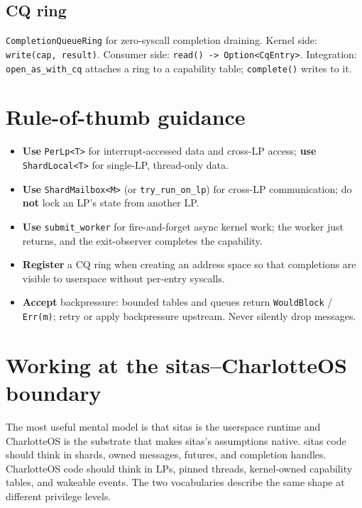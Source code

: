 \subsection{CQ ring} \texttt{CompletionQueueRing} for zero-syscall completion
draining. Kernel side: \texttt{write(cap, result)}. Consumer side:
\texttt{read() -> Option<CqEntry>}. Integration: \texttt{open\_as\_with\_cq}
attaches a ring to a capability table; \texttt{complete()} writes to it.

\section{Rule-of-thumb guidance}

\begin{itemize}
    \item \textbf{Use} \texttt{PerLp<T>} for interrupt-accessed data and
        cross-LP access; \textbf{use} \texttt{ShardLocal<T>} for single-LP,
        thread-only data.
    \item \textbf{Use} \texttt{ShardMailbox<M>} (or \texttt{try\_run\_on\_lp})
        for cross-LP communication; do \textbf{not} lock an LP's state from
        another LP.
    \item \textbf{Use} \texttt{submit\_worker} for fire-and-forget async
        kernel work; the worker just returns, and the exit-observer completes
        the capability.
    \item \textbf{Register} a CQ ring when creating an address space so that
        completions are visible to userspace without per-entry syscalls.
    \item \textbf{Accept} backpressure: bounded tables and queues return
        \texttt{WouldBlock} / \texttt{Err(m)}; retry or apply backpressure
        upstream. Never silently drop messages.
\end{itemize}

\section{Working at the sitas--CharlotteOS boundary}

The most useful mental model is that sitas is the userspace runtime and
CharlotteOS is the substrate that makes sitas's assumptions native. sitas code
should think in shards, owned messages, futures, and completion handles.
CharlotteOS code should think in LPs, pinned threads, kernel-owned capability
tables, and wakeable events. The two vocabularies describe the same shape at
different privilege levels.

